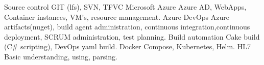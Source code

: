 \begin{cvskills}
  
\cvskill
{Source control} %
{GIT (lfs), SVN, TFVC} %
\cvskill
{Microsoft Azure} %
{Azure AD, WebApps, Container instances, VM's, resource management.} %
\cvskill
{Azure DevOps} %
{Azure artifacts(nuget), build agent administration, continuous integration,\newline continuous deployment, SCRUM administration, test planning.} %
\cvskill
{Build automation} %
{Cake build (C\# scripting), DevOps yaml build.} %
\cvskill
{Docker} %
{Compose, Kubernetes, Helm.} %
\cvskill
{HL7} %
{Basic understanding, using, parsing.} %

\end{cvskills}